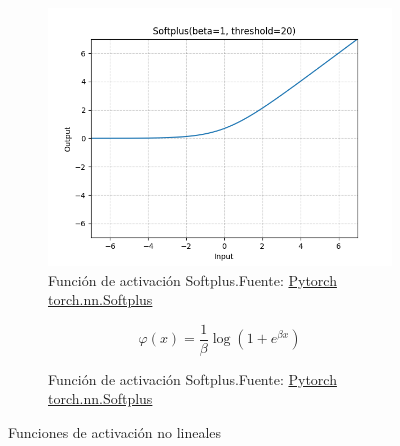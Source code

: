 \begin{figure}[H]
    \medskip
    \begin{subfigure}{.475\linewidth}
        \centering
        \includegraphics[width=0.75\linewidth]{figures/equations/Softplus.png}
        \caption{Función de activación Softplus.\newline{}Fuente: \href{https://pytorch.org/docs/stable/generated/torch.nn.Softplus.html}{Pytorch torch.nn.Softplus}}
        \label{subfig:torch.nn.Softplus}
    \end{subfigure}\hfill
    \begin{subfigure}{.475\linewidth}
        \centering
        \begin{equation*} \varphi(x) = \frac{1}{\beta} \operatorname*{log}\left(1+e^{\beta x}\right) \end{equation*}
        \caption{Función de activación Softplus.\newline{}Fuente: \href{https://pytorch.org/docs/stable/generated/torch.nn.Softplus.html}{Pytorch torch.nn.Softplus}}
        \label{subfig:eq-torch.nn.Softplus}
    \end{subfigure}

    \caption{Funciones de activación no lineales}
    \label{fig:p1--equations--Non-linear-Activations}
\end{figure}

